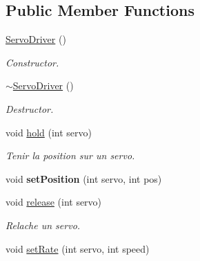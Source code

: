 \subsection*{Public Member Functions}
\begin{DoxyCompactItemize}
\item 
\mbox{\label{classServoDriver_a2076bae148e26ee3f854f1f1984d9714}} 
\hyperlink{classServoDriver_a2076bae148e26ee3f854f1f1984d9714}{Servo\+Driver} ()
\begin{DoxyCompactList}\small\item\em Constructor. \end{DoxyCompactList}\item 
\mbox{\label{classServoDriver_acf6cad7d5b891fbe4ff44eaec8409db7}} 
\hyperlink{classServoDriver_acf6cad7d5b891fbe4ff44eaec8409db7}{$\sim$\+Servo\+Driver} ()
\begin{DoxyCompactList}\small\item\em Destructor. \end{DoxyCompactList}\item 
\mbox{\label{classServoDriver_af580283b3d1765c9a27276e9a870cf88}} 
void \hyperlink{classServoDriver_af580283b3d1765c9a27276e9a870cf88}{hold} (int servo)
\begin{DoxyCompactList}\small\item\em Tenir la position sur un servo. \end{DoxyCompactList}\item 
\mbox{\label{classServoDriver_a670166dcdd739243ec2e728bf524e87e}} 
void {\bfseries set\+Position} (int servo, int pos)
\item 
\mbox{\label{classServoDriver_aa1040b0db7ed851aec70a122301fe665}} 
void \hyperlink{classServoDriver_aa1040b0db7ed851aec70a122301fe665}{release} (int servo)
\begin{DoxyCompactList}\small\item\em Relache un servo. \end{DoxyCompactList}\item 
\mbox{\label{classServoDriver_a5a10cd45849dea884d98046a5e8180ab}} 
void \hyperlink{classServoDriver_a5a10cd45849dea884d98046a5e8180ab}{set\+Rate} (int servo, int speed)

\end{DoxyCompactItemize}
